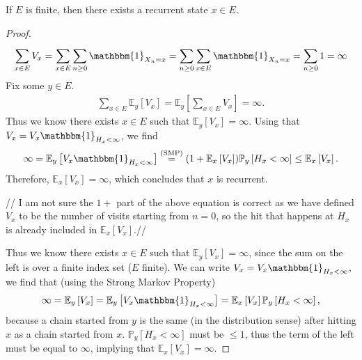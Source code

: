 \begin{prop}[]
	If $E$ is finite, then there exists a recurrent state $x \in E$.
\end{prop}
\begin{proof}
	\begin{align}
		\sum_{x \in E}^{} V_x = \sum_{x \in E}^{} \sum_{n\geq 0}^{} \mathbbm{1}_{X_n=x} = \sum_{n\geq 0}^{} \sum_{x \in E}^{} \mathbbm{1}_{X_n =x} = \sum_{n\geq 0}^{} 1  = \infty
\end{align}
Fix some $y \in E$.
\begin{align}
	\sum_{x \in E}^{} \mathbb{E}_{y} \left[ V_x \right] = \mathbb{E}_{y} \left[ \sum_{x \in E}^{} V_x \right] = \infty 
.	\end{align}
Thus we know there exists $x \in E$ such that $\mathbb{E}_{y} \left[ V_x \right] = \infty$. Using that $V_x = V_x\mathbbm{1}_{H_x < \infty} $, we find
\begin{align}
	\infty = \mathbb{E}_{y} \left[ V_x \mathbbm{1}_{H_x <\infty}  \right] \stackrel{\textrm{(SMP)}}{=}(1 + \mathbb{E}_{x} \left[ V_x \right] ) \mathbb{P}_{y} \left[ H_x < \infty \right] \leq \mathbb{E}_{x} \left[ V_x \right] .
\end{align}
Therefore, $\mathbb{E}_{x} \left[ V_x \right] = \infty$, which concludes that $x$ is recurrent.

{ \color{blue}
	// I am not sure the $1+$ part of the above equation is correct as we have defined $V_x$ to be the number of visits starting from $n=0$, so the hit that happens at $H_x$ is already included in $\mathbb{E}_{x} \left[ V_x \right] $.//

Thus we know there exists $x \in E$ such that $\mathbb{E}_{y} \left[ V_x \right] = \infty$, since the sum on the left is over a finite index set ($E$ finite). We can write $V_x = V_x \mathbbm{1}_{H_x<\infty}$, we find that (using the Strong Markov Property) 
\begin{align}
	\infty = \mathbb{E}_{y} \left[ V_x \right] = \mathbb{E}_{y} \left[ V_x \mathbbm{1}_{H_x<\infty}  \right] = \mathbb{E}_{x} \left[ V_x \right] \mathbb{P}_{y} \left[ H_x < \infty \right] 
,\end{align}
	 because a chain started from $y$ is the same (in the distribution sense) after hitting $x$ as a chain started from $x$. $\mathbb{P}_{y} \left[ H_x < \infty \right]$ must be $ \leq 1 $, thus the term of the left must be equal to $\infty$, implying that $\mathbb{E}_{x} \left[ V_x \right] = \infty$.
 }
\end{proof}


